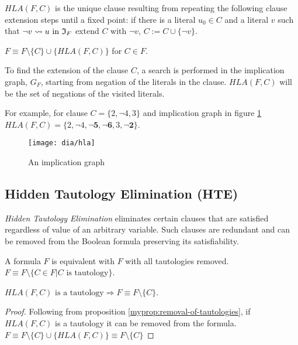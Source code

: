 \begin{mydef}
  $HLA(F, C)$ is the unique clause resulting from repeating the following
  clause extension steps until a fixed point: if there is a literal $u_0 \in C$
  and a literal $v$ such that $\neg v \rightsquigarrow u \text{ in } \mathfrak{I}_F$
  extend $C$ with $\neg v$, $C := C \cup \{ \neg v \}$.
\end{mydef}

\begin{myprop}
  $F \equiv F \setminus \{C\} \cup \{HLA(F, C)\}$ for $C \in F$.
\end{myprop}

To find the extension of the clause $C$, a search is performed in the
implication graph, $G_F$, starting from negation of the literals in
the clause. $HLA(F, C)$ will be the set of negations of the visited
literals.

For example, for clause $C = \{ 2, \neg 4, 3\}$
and implication graph in figure \ref{fig:hla}
$HLA(F, C) = \{2, \neg 4, \mathbf{\neg 5, \neg 6}, 3, \mathbf{\neg 2} \}$.

\begin{figure}
  \centering
  \texttt{[image: dia/hla]}
  \caption{An implication graph}
  \label{fig:hla}
\end{figure}


\subsection{Hidden Tautology Elimination (HTE)}
\label{ssec:hte}

\emph{Hidden Tautology Elimination} eliminates certain clauses that
are satisfied regardless of value of an arbitrary variable. Such
clauses are redundant and can be removed from the Boolean formula
preserving its satisfiability.

\begin{myprop}[TE]
  \label{myprop:removal-of-tautologies}
  A formula $F$ is equivalent with $F$ with all tautologies removed.
  $F \equiv F \setminus \{ C \in F | C \text{ is tautology}\}$.
\end{myprop}

\begin{myprop}[HTE]
  $HLA(F, C) \text{ is a tautology} \Rightarrow F \equiv F \setminus \{C\}$.
\end{myprop}

\begin{proof}
  Following from proposition \ref{myprop:removal-of-tautologies},
  if $HLA(F, C)$ is a tautology it can be removed from the formula.
  $F \equiv F \setminus \{C\} \cup \{HLA(F, C)\} \equiv F \setminus \{C\}$
\end{proof}

